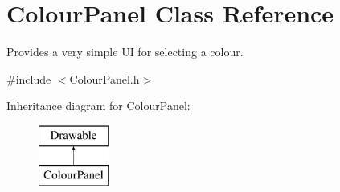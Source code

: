 \hypertarget{class_colour_panel}{}\section{Colour\+Panel Class Reference}
\label{class_colour_panel}


Provides a very simple UI for selecting a colour.  




{\ttfamily \#include $<$Colour\+Panel.\+h$>$}

Inheritance diagram for Colour\+Panel\+:\begin{figure}[H]
\begin{center}
\leavevmode
\includegraphics[height=2.000000cm]{class_colour_panel}
\end{center}
\end{figure}
